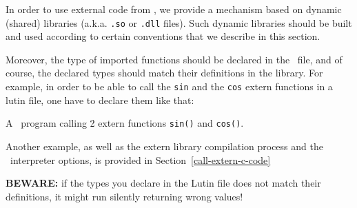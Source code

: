 In order to use external code from \lutin, we provide a mechanism based
on dynamic (shared) libraries (a.k.a.  {\tt .so} or {\tt .dll} files). 
%
Such dynamic libraries should be built and used according to certain
conventions that we describe in this section.

Moreover, the  type of imported  functions should be declared  in the
\lutin\  file, and  of course,  the declared  types should  match their
definitions in the library. For example,  in order to be able to call
the {\tt sin} and the {\tt cos} extern functions in a lutin file, one
have to declare them like that:

\begin{example}
A \lutin\ program calling 2 extern functions  {\tt sin()} and {\tt cos()}.
\begin{alltt}
\begin{small}

\end{small}
\end{alltt}
\end{example}

Another example,  as well as  the extern library  compilation process
and    the    \lutin\    interpreter    options,   is    provided    in
Section~\ref{call-extern-c-code}


{\bf BEWARE: } if the types you declare in the Lutin file does not
match their definitions, it might run silently returning wrong values!


